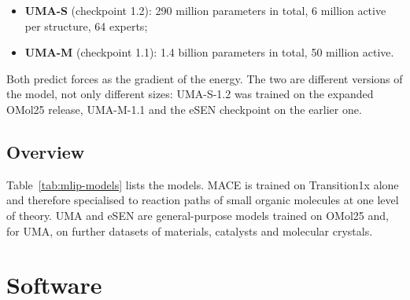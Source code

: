 \begin{itemize}
  \item \textbf{UMA-S} (checkpoint 1.2): 290 million parameters in
    total, 6 million active per structure, 64 experts;
  \item \textbf{UMA-M} (checkpoint 1.1): 1.4 billion parameters in
    total, 50 million active.
\end{itemize}

Both predict forces as the gradient of the energy. The two are
different versions of the model, not only different sizes: UMA-S-1.2 was
trained on the expanded OMol25 release, UMA-M-1.1 and the eSEN
checkpoint on the earlier one.

\subsection{Overview}
\label{sec:mlip-models}

\begin{table}[h]
\centering
\caption{The models of this thesis. All are equivariant message-passing
models with conservative forces.}
\label{tab:mlip-models}
\end{table}

Table~\ref{tab:mlip-models} lists the models.
MACE is trained on Transition1x alone and therefore specialised to reaction
paths of small organic molecules at one level of theory. UMA and eSEN are
general-purpose models trained on OMol25 and, for UMA, on further datasets
of materials, catalysts and molecular crystals.

\section{Software}
\label{sec:background-software}

